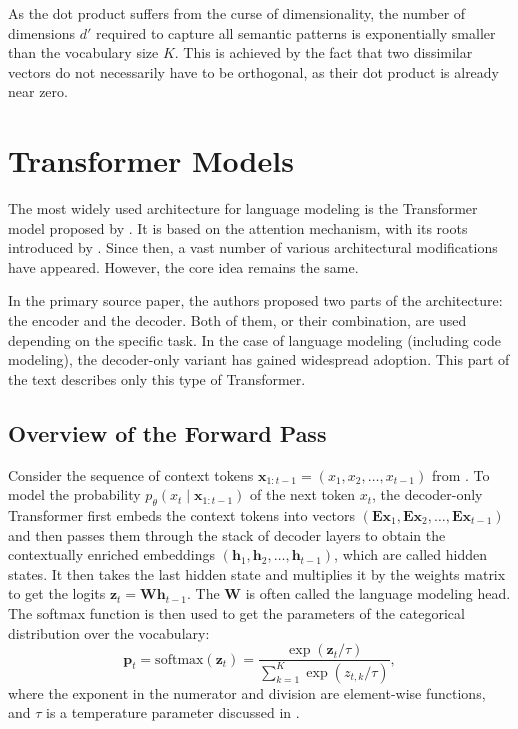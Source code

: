 As the dot product suffers from the curse of dimensionality, the number of dimensions \(d'\) required to capture all semantic patterns is exponentially smaller than the vocabulary size \(K\). This is achieved by the fact that two dissimilar vectors do not necessarily have to be orthogonal, as their dot product is already near zero.

\section{Transformer Models}

The most widely used architecture for language modeling is the Transformer model proposed by \citet{vaswani2017}. It is based on the attention mechanism, with its roots introduced by \citet{bahdanau2014}. Since then, a vast number of various architectural modifications have appeared. However, the core idea remains the same.

In the primary source paper, the authors proposed two parts of the architecture: the encoder and the decoder. Both of them, or their combination, are used depending on the specific task. In the case of language modeling (including code modeling), the decoder-only variant has gained widespread adoption. This part of the text describes only this type of Transformer.

\subsection{Overview of the Forward Pass}

Consider the sequence of context tokens \(\bm{x}_{1:t-1} = (x_1, x_2, \ldots, x_{t-1})\) from . To model the probability \(p_{\theta}(x_t \mid \bm{x}_{1:t-1})\) of the next token \(x_t\), the decoder-only Transformer first embeds the context tokens into vectors \((\mathbf{Ex}_1, \mathbf{Ex}_2, \ldots, \mathbf{Ex}_{t-1})\) and then passes them through the stack of decoder layers to obtain the contextually enriched embeddings \((\mathbf{h}_1, \mathbf{h}_2, \ldots, \mathbf{h}_{t-1})\), which are called hidden states. It then takes the last hidden state and multiplies it by the weights matrix to get the logits \(\mathbf{z}_t = \mathbf{Wh}_{t-1}\). The \(\mathbf{W}\) is often called the language modeling head. The softmax function is then used to get the parameters of the categorical distribution over the vocabulary:
\begin{equation}\label{eq:softmax}
    \mathbf{p}_t = \mathrm{softmax}(\mathbf{z}_t) = \frac{\exp(\mathbf{z}_t / \tau)}{\sum_{k=1}^{K} \exp(z_{t,k} / \tau)},
\end{equation}
where the exponent in the numerator and division are element-wise functions, and \(\tau\) is a temperature parameter discussed in .

